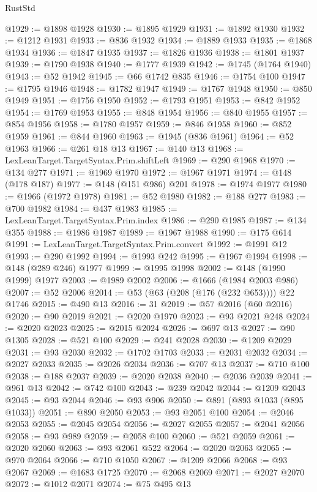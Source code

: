 \begin{lexlean}{RustStd}
\begin{coremodule}
@1929 := @1898 @1928
@1930 := @1895 @1929
@1931 := @1892 @1930
@1932 := @1212 @1931
@1933 := @836 @1932
@1934 := @1889 @1933
@1935 := @1868 @1934
@1936 := @1847 @1935
@1937 := @1826 @1936
@1938 := @1801 @1937
@1939 := @1790 @1938
@1940 := @1777 @1939
@1942 := @1745 (@1764 @1940)
@1943 := @52 @1942
@1945 := @66 @1742 @835
@1946 := @1754 @100
@1947 := @1795 @1946
@1948 := @1782 @1947
@1949 := @1767 @1948
@1950 := @850 @1949
@1951 := @1756 @1950
@1952 := @1793 @1951
@1953 := @842 @1952
@1954 := @1769 @1953
@1955 := @848 @1954
@1956 := @840 @1955
@1957 := @854 @1956
@1958 := @1780 @1957
@1959 := @846 @1958
@1960 := @852 @1959
@1961 := @844 @1960
@1963 := @1945 (@836 @1961)
@1964 := @52 @1963
@1966 := @261 @18 @13
@1967 := @140 @13
@1968 := LexLeanTarget.TargetSyntax.Prim.shiftLeft
@1969 := @290 @1968
@1970 := @134 @277
@1971 := @1969 @1970
@1972 := @1967 @1971
@1974 := @148 (@178 @187)
@1977 := @148 (@151 @986) @201
@1978 := @1974 @1977
@1980 := @1966 (@1972 @1978)
@1981 := @52 @1980
@1982 := @188 @277
@1983 := @700 @1982
@1984 := @437 @1983
@1985 := LexLeanTarget.TargetSyntax.Prim.index
@1986 := @290 @1985
@1987 := @134 @355
@1988 := @1986 @1987
@1989 := @1967 @1988
@1990 := @175 @614
@1991 := LexLeanTarget.TargetSyntax.Prim.convert
@1992 := @1991 @12
@1993 := @290 @1992
@1994 := @1993 @242
@1995 := @1967 @1994
@1998 := @148 (@289 @246) @1977
@1999 := @1995 @1998
@2002 := @148 (@1990 @1999) @1977
@2003 := @1989 @2002
@2006 := @1666 (@1984 @2003 @986)
@2007 := @52 @2006
@2014 := @53 (@63 (@208 (@176 (@232 @653)))) @22 @1746
@2015 := @490 @13
@2016 := 31
@2019 := @57 @2016 (@60 @2016)
@2020 := @90 @2019
@2021 := @2020 @1970
@2023 := @93 @2021 @248
@2024 := @2020 @2023
@2025 := @2015 @2024
@2026 := @697 @13
@2027 := @90 @1305
@2028 := @521 @100
@2029 := @241 @2028
@2030 := @1209 @2029
@2031 := @93 @2030
@2032 := @1702 @1703
@2033 := @2031 @2032
@2034 := @2027 @2033
@2035 := @2026 @2034
@2036 := @707 @13
@2037 := @710 @100
@2038 := @188 @2037
@2039 := @2020 @2038
@2040 := @2036 @2039
@2041 := @961 @13
@2042 := @742 @100
@2043 := @239 @2042
@2044 := @1209 @2043
@2045 := @93 @2044
@2046 := @93 @906
@2050 := @891 (@893 @1033 (@895 @1033))
@2051 := @890 @2050
@2053 := @93 @2051 @100
@2054 := @2046 @2053
@2055 := @2045 @2054
@2056 := @2027 @2055
@2057 := @2041 @2056
@2058 := @93 @989
@2059 := @2058 @100
@2060 := @521 @2059
@2061 := @2020 @2060
@2063 := @93 @2061 @522
@2064 := @2020 @2063
@2065 := @970 @2064
@2066 := @710 @1050
@2067 := @1209 @2066
@2068 := @93 @2067
@2069 := @1683 @1725
@2070 := @2068 @2069
@2071 := @2027 @2070
@2072 := @1012 @2071
@2074 := @75 @495 @13

\end{coremodule}
\end{lexlean}
